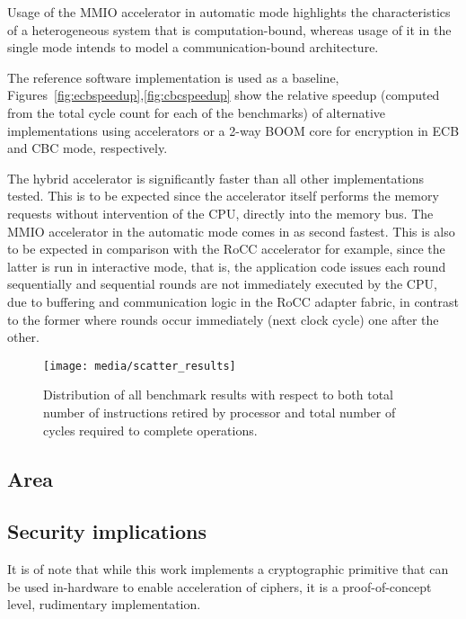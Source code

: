 \documentclass[10pt,conference]{IEEEtran}
\begin{document}
Usage of the MMIO accelerator in automatic mode highlights the characteristics
of a heterogeneous system that is computation-bound, whereas usage of it in the
single mode intends to model a communication-bound architecture.

The reference software implementation is used as a baseline,
Figures~\ref{fig:ecbspeedup},\ref{fig:cbcspeedup} show the relative speedup
(computed from the total cycle count for each of the benchmarks) of alternative
implementations using accelerators or a 2-way BOOM core for encryption in ECB
and CBC mode, respectively.

The hybrid accelerator is significantly faster than all other implementations
tested. This is to be expected since the accelerator itself performs the memory
requests without intervention of the CPU, directly into the memory bus. The
MMIO accelerator in the automatic mode comes in as second fastest. This
is also to be expected in comparison with the RoCC accelerator for example,
since the latter is run in interactive mode, that is, the application code
issues each round sequentially and sequential rounds are not immediately
executed by the CPU, due to buffering and communication logic in the RoCC
adapter fabric, in contrast to the former where rounds occur immediately (next
clock cycle) one after the other.



\begin{figure}
  \centering
  \texttt{[image: media/scatter\_results]}
  \caption{Distribution of all benchmark results with respect to both total
    number of instructions retired by processor and total number of cycles
    required to complete operations.}
  \label{fig:scatter}
\end{figure}

\subsection{Area}

\subsection{Security implications}

It is of note that while this work implements a cryptographic primitive that can
be used in-hardware to enable acceleration of ciphers, it is a proof-of-concept
level, rudimentary implementation.
\end{document}
